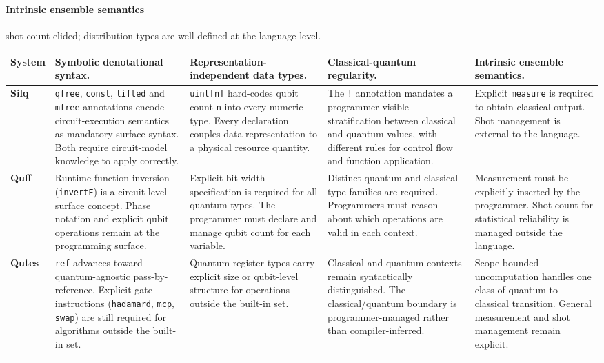 \paragraph{Intrinsic ensemble semantics} shot count elided; distribution types are well-defined at the language level.

\begin{longtable}{p{1.8cm} p{3.3cm} p{3.3cm} p{3.3cm} p{3.3cm}}
    \toprule
    \textbf{System}
    & \textbf{Symbolic denotational syntax.}
    & \textbf{Representation-independent data types.}
    & \textbf{Classical-quantum regularity.}
    & \textbf{Intrinsic ensemble semantics.} \\
    \midrule
    \endhead

    \textbf{Silq}~\cite{bichsel2020silq}
    & \texttt{qfree}, \texttt{const}, \texttt{lifted} and \texttt{mfree} annotations encode circuit-execution semantics as mandatory surface syntax. Both require circuit-model knowledge to apply correctly.
    & \texttt{uint[n]} hard-codes qubit count \texttt{n} into every numeric type. Every declaration couples data representation to a physical resource quantity.
    & The \texttt{!} annotation mandates a programmer-visible stratification between classical and quantum values, with different rules for control flow and function application.
    & Explicit \texttt{measure} is required to obtain classical output. Shot management is external to the language. \\ \addlinespace

    \textbf{Quff}~\cite{wright2024quff}
    & Runtime function inversion (\texttt{invertF}) is a circuit-level surface concept. Phase notation and explicit qubit operations remain at the programming surface.
    & Explicit bit-width specification is required for all quantum types. The programmer must declare and manage qubit count for each variable.
    & Distinct quantum and classical type families are required. Programmers must reason about which operations are valid in each context.
    & Measurement must be explicitly inserted by the programmer. Shot count for statistical reliability is managed outside the language. \\ \addlinespace

    \textbf{Qutes}~\cite{faro2025qutes}
    & \texttt{ref} advances toward quantum-agnostic pass-by-reference. Explicit gate instructions (\texttt{hadamard}, \texttt{mcp}, \texttt{swap}) are still required for algorithms outside the built-in set.
    & Quantum register types carry explicit size or qubit-level structure for operations outside the built-in set.
    & Classical and quantum contexts remain syntactically distinguished. The classical/quantum boundary is programmer-managed rather than compiler-inferred.
    & Scope-bounded uncomputation handles one class of quantum-to-classical transition. General measurement and shot management remain explicit. \\ \addlinespace


\end{longtable}
